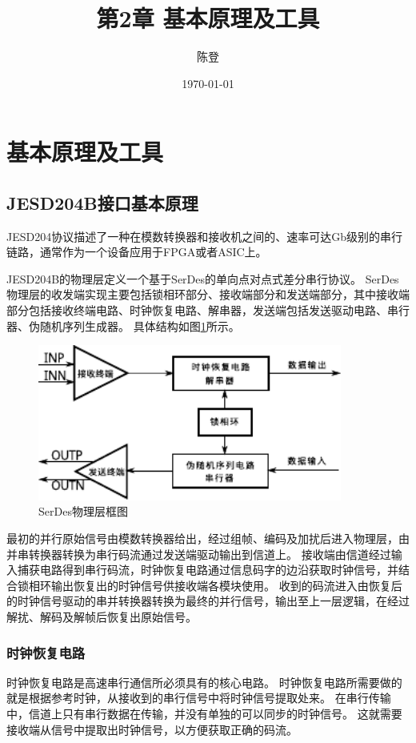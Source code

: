 \documentclass[UTF8]{ctexart}
\title{第2章 基本原理及工具}
\author{陈登}
\date{\today}
\begin{document}
\section{基本原理及工具}

\subsection{JESD204B接口基本原理}

JESD204协议描述了一种在模数转换器和接收机之间的、速率可达Gb级别的串行链路，通常作为一个设备应用于FPGA或者ASIC上。

JESD204B的物理层定义一个基于SerDes的单向点对点式差分串行协议。
SerDes物理层的收发端实现主要包括锁相环部分、接收端部分和发送端部分，其中接收端部分包括接收终端电路、时钟恢复电路、解串器，发送端包括发送驱动电路、串行器、伪随机序列生成器\cite{nishi2008asic}。
具体结构如图\ref{fig:serdes_phylayer_summery}所示。

\begin{figure}[H]
\centering
\includegraphics[width=10cm]{./img/serdes_phylayer_summery.pdf}
\caption{SerDes物理层框图}
\label{fig:serdes_phylayer_summery}
\end{figure}

最初的并行原始信号由模数转换器给出，经过组帧、编码及加扰后进入物理层，由并串转换器转换为串行码流通过发送端驱动输出到信道上。
接收端由信道经过输入捕获电路得到串行码流，时钟恢复电路通过信息码字的边沿获取时钟信号，并结合锁相环输出恢复出的时钟信号供接收端各模块使用。
收到的码流进入由恢复后的时钟信号驱动的串并转换器转换为最终的并行信号，输出至上一层逻辑，在经过解扰、解码及解帧后恢复出原始信号。

\subsubsection{时钟恢复电路}

时钟恢复电路是高速串行通信所必须具有的核心电路。
时钟恢复电路所需要做的就是根据参考时钟，从接收到的串行信号中将时钟信号提取处来。
在串行传输中，信道上只有串行数据在传输，并没有单独的可以同步的时钟信号。
这就需要接收端从信号中提取出时钟信号，以方便获取正确的码流。
\end{document}
